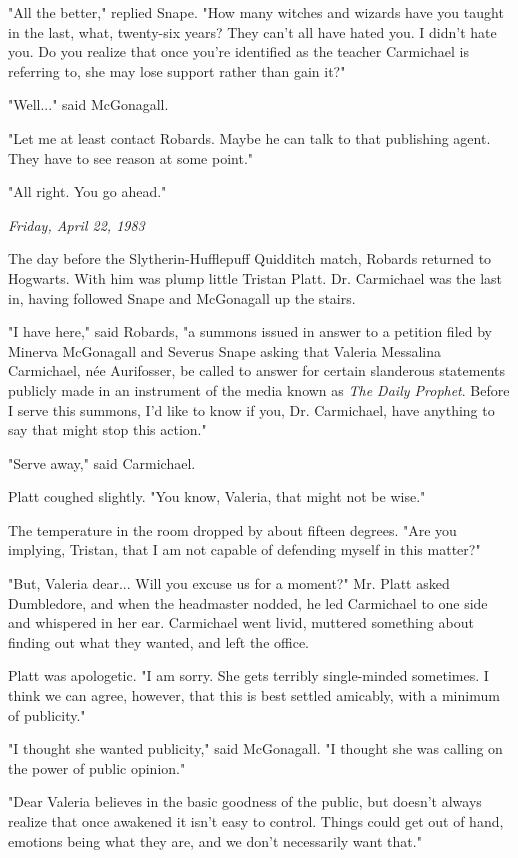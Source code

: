 \documentclass[a4paper,11pt]{article}
\begin{document}
"All the better," replied Snape. "How many witches and wizards have you taught in the last, what, twenty-six years? They can't all have hated you. I didn't hate you. Do you realize that once you're identified as the teacher Carmichael is referring to, she may lose support rather than gain it?"

"Well..." said McGonagall.

"Let me at least contact Robards. Maybe he can talk to that publishing agent. They have to see reason at some point."

"All right. You go ahead."

\emph{Friday, April 22, 1983}

The day before the Slytherin-Hufflepuff Quidditch match, Robards returned to Hogwarts. With him was plump little Tristan Platt. Dr. Carmichael was the last in, having followed Snape and McGonagall up the stairs.

"I have here," said Robards, "a summons issued in answer to a petition filed by Minerva McGonagall and Severus Snape asking that Valeria Messalina Carmichael, née Aurifosser, be called to answer for certain slanderous statements publicly made in an instrument of the media known as \emph{The Daily Prophet}. Before I serve this summons, I'd like to know if you, Dr. Carmichael, have anything to say that might stop this action."

"Serve away," said Carmichael.

Platt coughed slightly. "You know, Valeria, that might not be wise."

The temperature in the room dropped by about fifteen degrees. "Are you implying, Tristan, that I am not capable of defending myself in this matter?"

"But, Valeria dear... Will you excuse us for a moment?" Mr. Platt asked Dumbledore, and when the headmaster nodded, he led Carmichael to one side and whispered in her ear. Carmichael went livid, muttered something about finding out what they wanted, and left the office.

Platt was apologetic. "I am sorry. She gets terribly single-minded sometimes. I think we can agree, however, that this is best settled amicably, with a minimum of publicity."

"I thought she wanted publicity," said McGonagall. "I thought she was calling on the power of public opinion."

"Dear Valeria believes in the basic goodness of the public, but doesn't always realize that once awakened it isn't easy to control. Things could get out of hand, emotions being what they are, and we don't necessarily want that."
\end{document}

